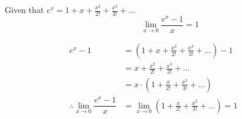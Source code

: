 \documentclass[14pt,fleqn]{extarticle}
\begin{document}
 

\begin{snippet}
    \correct

Given that $ e^x = 1 + x + \frac{x^2}{2!} + \frac{x^3}{3!} + \ldots$
\[\qquad \qquad \lim_{x\to 0}\dfrac{e^x-1}{x} = 1 \]
        
    \reason


\begin{align}
e^x - 1 &= \left( 1 + x + \frac{x^2}{2!} + \frac{x^3}{3!} + \ldots\right) - 1 \\ 
&= x + \frac{x^2}{2!} + \frac{x^3}{3!} + \ldots \\
&= x\cdot\left( 1 + \frac{x}{2!} + \frac{x^2}{3!} + \ldots\right) \\
\therefore \lim_{x\to 0}\dfrac{e^x-1}{x} &= \lim_{x\to 0}\left( 1 + \frac{x}{2!} + \frac{x^2}{3!} + \ldots\right) = 1
\end{align}
    
\end{snippet} 
\end{document}
